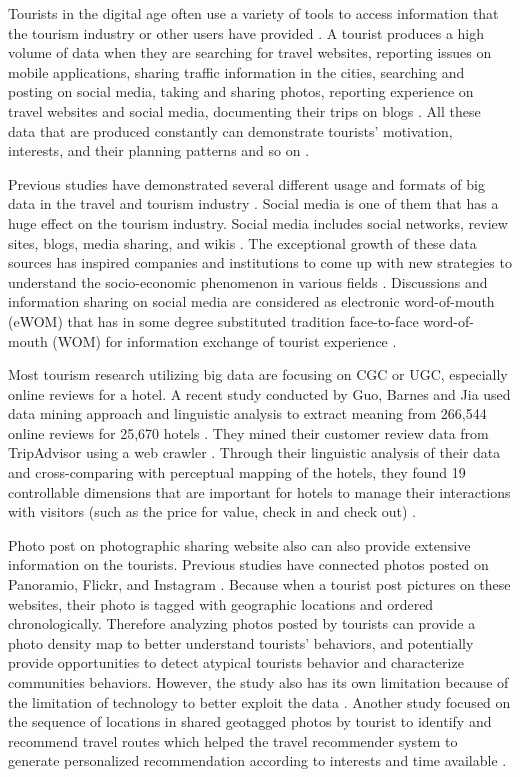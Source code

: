 Tourists in the digital age often use a variety of tools to access information that
the tourism industry or other users have provided \cite{XIANG2015120}. A tourist
produces a high volume of data when they are searching for travel websites, reporting
issues on mobile applications, sharing traffic information in the cities, searching and
posting on social media, taking and sharing photos, reporting experience on travel
websites and social media, documenting their trips on blogs \cite{akerkar2012, Shafiee16}. 
All these data that are produced constantly can demonstrate tourists' motivation, 
interests, and their planning patterns and so on \cite{XIE2017101}.

Previous studies have demonstrated several different usage and formats of big data in
the travel and tourism industry \cite{XIE2017101}. Social media is one of them that
has a huge effect on the tourism industry. Social media includes social networks,
review sites, blogs, media sharing, and wikis \cite{XIANG2015120}. The exceptional
growth of these data sources has inspired companies and institutions to come up with 
new strategies to understand the socio-economic phenomenon in various
fields \cite{Shafiee16}. Discussions and information sharing on social media are
considered as electronic word-of-mouth (eWOM) that has in some degree substituted
tradition face-to-face word-of-mouth (WOM) for information exchange of tourist
experience \cite{chung2009}. 

Most tourism research utilizing big data are focusing on CGC or UGC, especially
online reviews for a hotel. A recent study conducted by Guo, Barnes and Jia used data
mining approach and linguistic analysis to extract meaning from 266,544 online reviews
for 25,670 hotels \cite{GUO2017467}. They mined their customer review data from TripAdvisor
using a web crawler \cite{GUO2017467}. Through their linguistic analysis of their data 
and cross-comparing with perceptual mapping of the hotels, they found 19 controllable
dimensions that are important for hotels to manage their interactions with visitors
(such as the price for value, check in and check out) \cite{GUO2017467}.

Photo post on photographic sharing website also can also provide extensive information
on the tourists. Previous studies have connected photos posted on Panoramio, Flickr,
and Instagram \cite{GJT14, MIAH2017}. Because when a tourist post pictures on these
websites, their photo is tagged with geographic locations and ordered chronologically.
Therefore analyzing photos posted by tourists can provide a photo density map to
better understand tourists' behaviors, and potentially provide opportunities to detect
atypical tourists behavior and characterize communities behaviors. However, the study
also has its own limitation because of the limitation of technology to better exploit
the data \cite{GJT14}. Another study focused on the sequence of locations in shared
geotagged photos by tourist to identify and recommend travel routes which helped the
travel recommender system to generate personalized recommendation according to
interests and time available \cite{MIAH2017}. 

